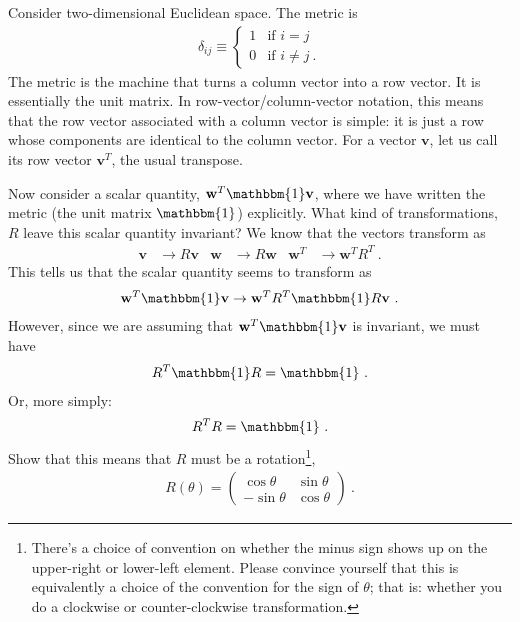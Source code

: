 \documentclass[12pt]{article}
\numberwithin{equation}{section}    %
\renewcommand{\vec}[1]{\mathbf{#1}} %
\begin{document}
Consider two-dimensional Euclidean space. The metric is 
\begin{align}
	\delta_{ij} \equiv 
	\begin{cases}
	1 & \text{if $i=j$}
	\\
	0 & \text{if $i\neq j$} \ .
	\end{cases}
\end{align}
The metric is the machine that turns a column vector into a row vector. It is essentially the unit matrix. In row-vector/column-vector notation, this means that the row vector associated with a column vector is simple: it is just a row whose components are identical to the column vector.  For a vector $\vec{v}$, let us call its row vector $\vec{v}^T$, the usual transpose. 

Now consider a scalar quantity, $\vec{w}^T \mathbbm{1} \vec{v}$, where we have written the metric (the unit matrix $\mathbbm{1}$) explicitly. What kind of transformations, $R$ leave this scalar quantity invariant? We know that the vectors transform as
\begin{align}
	\vec{v} &\to R \vec{v}
	&
	\vec{w} &\to R\vec{w}
	&
	\vec{w}^T &\to \vec{w}^T R^T \ .
	\label{eq:vector:transform}
\end{align}
This tells us that the scalar quantity seems to transform as
\begin{align}
	\vec{w}^T \mathbbm{1} \vec{v} \to \vec{w}^T R^T \mathbbm{1} R \vec{v} \ .
\end{align}
However, since we are assuming that $\vec{w}^T \mathbbm{1} \vec{v}$ is invariant, we must have
\begin{align}
	R^T \mathbbm{1} R = \mathbbm{1} \ .
\end{align}
Or, more simply:
\begin{align}
	R^T R = \mathbbm{1} \ .
\end{align}
Show that this means that $R$ must be a rotation\footnote{There's a choice of convention on whether the minus sign shows up on the upper-right or lower-left element. Please convince yourself that this is equivalently a choice of the convention for the sign of $\theta$; that is: whether you do a clockwise or counter-clockwise transformation.},
\begin{align}
	R(\theta) = 
	\begin{pmatrix}
			\cos\theta & \sin\theta \\
			-\sin\theta & \cos\theta
		\end{pmatrix}	 \ .
		\label{eq:rotations}
\end{align}
\end{document}
